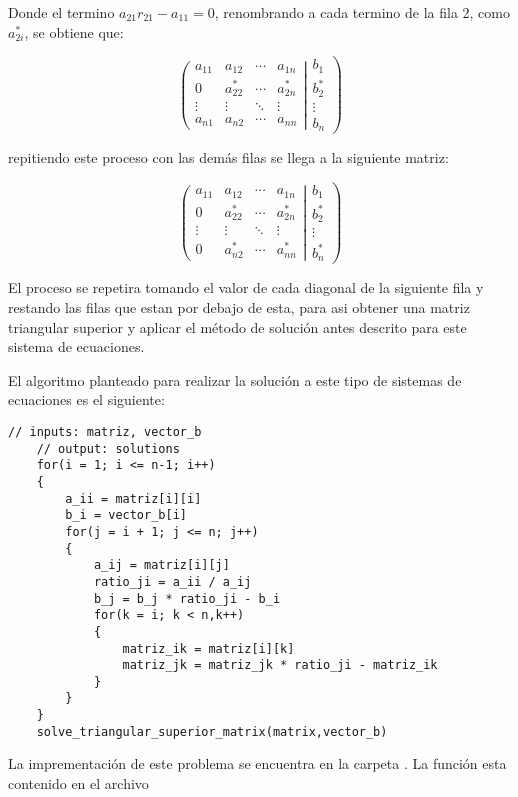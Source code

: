 Donde el termino $a_{21}r_{21}-a_{11}=0$, renombrando a cada termino de la fila 2, como $a_{2i}^*$, se obtiene que:

\begin{equation*}
    \left(\begin{matrix}
        a_{11} & a_{12}   & \cdots & a_{1n}   \\
        0      & a_{22}^* & \cdots & a_{2n}^* \\
        \vdots & \vdots   & \ddots & \vdots   \\
        a_{n1} & a_{n2}   & \cdots & a_{nn}
    \end{matrix}\right| \left.
    \begin{matrix}
        b_1    \\
        b_2^*  \\
        \vdots \\
        b_n
    \end{matrix}
    \right)
\end{equation*}

repitiendo este proceso con las demás filas se llega a la siguiente matriz:

\begin{equation*}
    \left(\begin{matrix}
        a_{11} & a_{12}   & \cdots & a_{1n}   \\
        0      & a_{22}^* & \cdots & a_{2n}^* \\
        \vdots & \vdots   & \ddots & \vdots   \\
        0      & a_{n2}^* & \cdots & a_{nn}^*
    \end{matrix}\right| \left.
    \begin{matrix}
        b_1    \\
        b_2^*  \\
        \vdots \\
        b_n^*
    \end{matrix}
    \right)
\end{equation*}

El proceso se repetira tomando el valor de cada diagonal de la siguiente fila y restando las filas que estan por debajo de esta, para asi obtener una matriz triangular superior y aplicar el método de solución antes descrito para este sistema de ecuaciones.

El algoritmo planteado para realizar la solución a este tipo de sistemas de ecuaciones es el siguiente:

\begin{lstlisting}[style=CStyle]
    // inputs: matriz, vector_b
    // output: solutions
    for(i = 1; i <= n-1; i++)
    {
        a_ii = matriz[i][i]
        b_i = vector_b[i]
        for(j = i + 1; j <= n; j++)
        {
            a_ij = matriz[i][j]
            ratio_ji = a_ii / a_ij
            b_j = b_j * ratio_ji - b_i
            for(k = i; k < n,k++)
            {
                matriz_ik = matriz[i][k]
                matriz_jk = matriz_jk * ratio_ji - matriz_ik
            }
        }
    }
    solve_triangular_superior_matrix(matrix,vector_b)
\end{lstlisting}

La imprementación de este problema se encuentra en la carpeta . La función  esta contenido en el archivo 